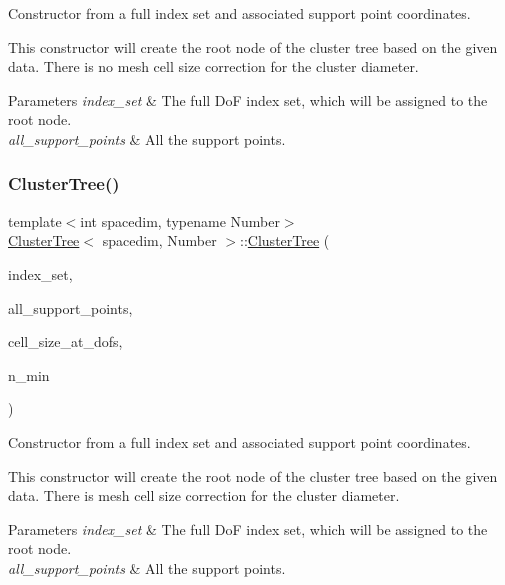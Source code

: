 Constructor from a full index set and associated support point coordinates.

This constructor will create the root node of the cluster tree based on the given data. There is no mesh cell size correction for the cluster diameter. 
\begin{DoxyParams}{Parameters}
{\em index\+\_\+set} & The full DoF index set, which will be assigned to the root node. \\
\hline
{\em all\+\_\+support\+\_\+points} & All the support points. \\
\hline
\end{DoxyParams}
\mbox{\label{classClusterTree_a3fd518db632c62cfafb61e9ef56097c7}} 
\subsubsection{\texorpdfstring{Cluster\+Tree()}{ClusterTree()}\hspace{0.1cm}{\footnotesize\ttfamily [4/5]}}
{\footnotesize\ttfamily template$<$int spacedim, typename Number$>$ \\
\hyperlink{classClusterTree}{Cluster\+Tree}$<$ spacedim, Number $>$\+::\hyperlink{classClusterTree}{Cluster\+Tree} (\begin{DoxyParamCaption}\item[{const std\+::vector$<$ types\+::global\+\_\+dof\+\_\+index $>$ \&}]{index\+\_\+set,  }\item[{const std\+::vector$<$ Point$<$ spacedim $>$$>$ \&}]{all\+\_\+support\+\_\+points,  }\item[{const std\+::vector$<$ Number $>$ \&}]{cell\+\_\+size\+\_\+at\+\_\+dofs,  }\item[{const unsigned int}]{n\+\_\+min }\end{DoxyParamCaption})}

Constructor from a full index set and associated support point coordinates.

This constructor will create the root node of the cluster tree based on the given data. There is mesh cell size correction for the cluster diameter. 
\begin{DoxyParams}{Parameters}
{\em index\+\_\+set} & The full DoF index set, which will be assigned to the root node. \\
\hline
{\em all\+\_\+support\+\_\+points} & All the support points. \\
\hline
\end{DoxyParams}
\mbox{\label{classClusterTree_a40d41a3a87bee15fe2d0b39a42f705d2}} 
